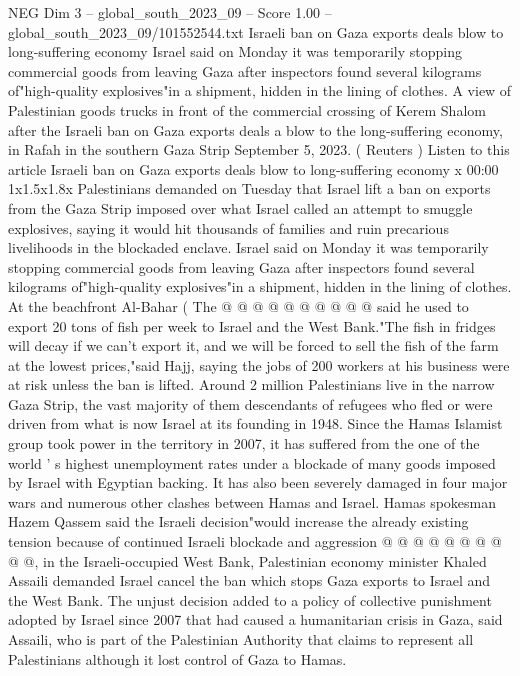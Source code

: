 \begin{textsample}{NEG Dim 3 – global\_south\_2023\_09 – Score 1.00 – global\_south\_2023\_09/101552544.txt}  \label{ex:f3_neg_332}
Israeli ban on Gaza exports deals blow to long-suffering economy Israel said on Monday it was temporarily stopping commercial goods from leaving Gaza after inspectors found several kilograms of"high-quality explosives"in a shipment, hidden in the lining of clothes.
A view of Palestinian goods trucks in front of the commercial crossing of Kerem Shalom after the Israeli ban on Gaza exports deals a blow to the long-suffering economy, in Rafah in the southern Gaza Strip September 5, 2023. ( Reuters ) Listen to this article Israeli ban on Gaza exports deals blow to long-suffering economy x 00:00 1x1.5x1.8x Palestinians demanded on Tuesday that Israel lift a ban on exports from the Gaza Strip imposed over what Israel called an attempt to smuggle explosives, saying it would hit thousands of families and ruin precarious livelihoods in the blockaded enclave.
Israel said on Monday it was temporarily stopping commercial goods from leaving Gaza after inspectors found several kilograms of"high-quality explosives"in a shipment, hidden in the lining of clothes.
At the beachfront Al-Bahar ( The @ @ @ @ @ @ @ @ @ @ said he used to export 20 tons of fish per week to Israel and the West Bank."The fish in fridges will decay if we can't export it, and we will be forced to sell the fish of the farm at the lowest prices,"said Hajj, saying the jobs of 200 workers at his business were at risk unless the ban is lifted.
Around 2 million Palestinians live in the narrow Gaza Strip, the vast majority of them descendants of refugees who fled or were driven from what is now Israel at its founding in 1948.
Since the Hamas Islamist group took power in the territory in 2007, it has suffered from the one of the world ' s highest unemployment rates under a blockade of many goods imposed by Israel with Egyptian backing.
It has also been severely damaged in four major wars and numerous other clashes between Hamas and Israel.
Hamas spokesman Hazem Qassem said the Israeli decision"would increase the already existing tension because of continued Israeli blockade and aggression @ @ @ @ @ @ @ @ @ @, in the Israeli-occupied West Bank, Palestinian economy minister Khaled Assaili demanded Israel cancel the ban which stops Gaza exports to Israel and the West Bank.
The unjust decision added to a policy of collective punishment adopted by Israel since 2007 that had caused a humanitarian crisis in Gaza, said Assaili, who is part of the Palestinian Authority that claims to represent all Palestinians although it lost control of Gaza to Hamas.

\end{textsample}
